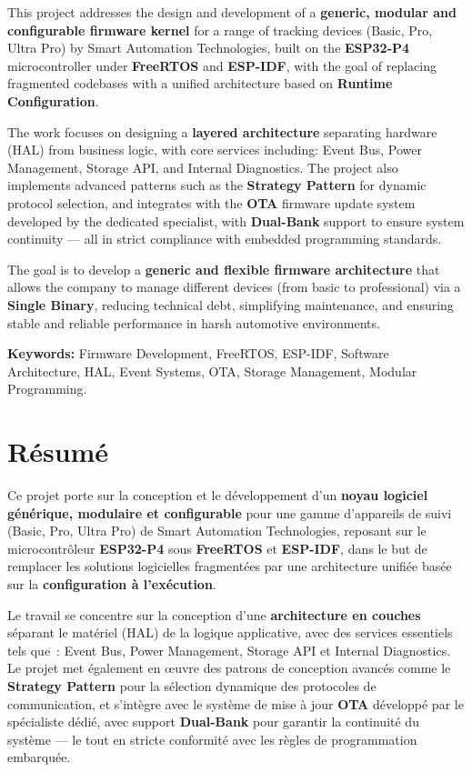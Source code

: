 \noindent
This project addresses the design and development of a \textbf{generic, modular and configurable firmware kernel} for a range of tracking devices (Basic, Pro, Ultra Pro) by Smart Automation Technologies, built on the \textbf{ESP32-P4} microcontroller under \textbf{FreeRTOS} and \textbf{ESP-IDF}, with the goal of replacing fragmented codebases with a unified architecture based on \textbf{Runtime Configuration}.

\medskip\noindent
The work focuses on designing a \textbf{layered architecture} separating hardware (HAL) from business logic, with core services including: Event Bus, Power Management, Storage API, and Internal Diagnostics. The project also implements advanced patterns such as the \textbf{Strategy Pattern} for dynamic protocol selection, and integrates with the \textbf{OTA} firmware update system developed by the dedicated specialist, with \textbf{Dual-Bank} support to ensure system continuity --- all in strict compliance with embedded programming standards.

\medskip\noindent
The goal is to develop a \textbf{generic and flexible firmware architecture} that allows the company to manage different devices (from basic to professional) via a \textbf{Single Binary}, reducing technical debt, simplifying maintenance, and ensuring stable and reliable performance in harsh automotive environments.

\bigskip\noindent
\textbf{Keywords:} Firmware Development, FreeRTOS, ESP-IDF, Software Architecture, HAL, Event Systems, OTA, Storage Management, Modular Programming.
\newpage

\chapter*{Résumé}

\noindent
Ce projet porte sur la conception et le développement d'un \textbf{noyau
logiciel générique, modulaire et configurable} pour une gamme d'appareils
de suivi (Basic, Pro, Ultra Pro) de Smart Automation Technologies,
reposant sur le microcontrôleur \textbf{ESP32-P4} sous \textbf{FreeRTOS}
et \textbf{ESP-IDF}, dans le but de remplacer les solutions logicielles
fragmentées par une architecture unifiée basée sur la
\textbf{configuration à l'exécution}.

\medskip\noindent
Le travail se concentre sur la conception d'une \textbf{architecture en
couches} séparant le matériel (HAL) de la logique applicative, avec des
services essentiels tels que~: Event Bus, Power Management, Storage API
et Internal Diagnostics. Le projet met également en œuvre des patrons de
conception avancés comme le \textbf{Strategy Pattern} pour la sélection
dynamique des protocoles de communication, et s'intègre avec le système
de mise à jour \textbf{OTA} développé par le spécialiste dédié, avec
support \textbf{Dual-Bank} pour garantir la continuité du système ---
le tout en stricte conformité avec les règles de programmation embarquée.

